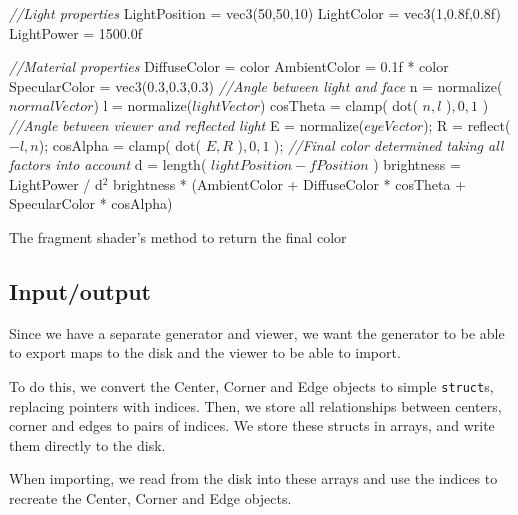 \begin{algo*}
\begin{sourcecode}
\textit{//Light properties}
LightPosition = vec3(50,50,10)
LightColor = vec3(1,0.8f,0.8f)
LightPower = 1500.0f
 
\textit{//Material properties}
DiffuseColor = color
AmbientColor = 0.1f * color
SpecularColor = vec3(0.3,0.3,0.3)
\vspace{0.2cm}
\textit{//Angle between light and face}
n = normalize($normalVector$)
l = normalize($lightVector$)
cosTheta = clamp( dot( $n, l$ )$, 0, 1 $ )
\vspace{0.2cm}
\textit{//Angle between viewer and reflected light}
E = normalize($eyeVector$);
R = reflect($-l,n$);
cosAlpha = clamp( dot( $E,R$ )$, 0, 1$ );
\vspace{0.2cm}
\textit{//Final color determined taking all factors into account}
d = length( $lightPosition - fPosition$ )
brightness = LightPower / d$^2$
\return brightness * (AmbientColor + DiffuseColor * cosTheta + SpecularColor * cosAlpha)
\vspace{0.2cm}
\qend
\end{sourcecode}
        \caption{The fragment shader's method to return the final color}
        \label{alg:frag}
\end{algo*}

\subsection{Input/output}

Since we have a separate generator and viewer, we want the generator to be able to export maps to the disk and the viewer to be able to import.

To do this, we convert the Center, Corner and Edge objects to simple \texttt{struct}s, replacing pointers with indices.
Then, we store all relationships between centers, corner and edges to pairs of indices.
We store these structs in arrays, and write them directly to the disk.

When importing, we read from the disk into these arrays and use the indices to recreate the Center, Corner and Edge objects.
